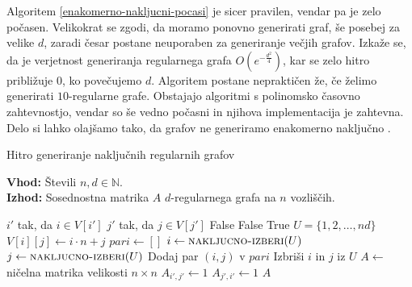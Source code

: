 Algoritem \ref{enakomerno-nakljucni-pocasi} je sicer pravilen, vendar pa je zelo počasen. Velikokrat se zgodi, da moramo ponovno generirati graf, še posebej za velike \(d\), zaradi česar postane neuporaben za generiranje večjih grafov. Izkaže se, da je verjetnost generiranja regularnega grafa \(O(e^{-\frac{d^2}{4}})\), kar se zelo hitro približuje \(0\), ko povečujemo \(d\). Algoritem postane nepraktičen že, če želimo generirati \(10\)-regularne grafe. Obstajajo algoritmi s polinomsko časovno zahtevnostjo, vendar so še vedno počasni in njihova implementacija je zahtevna. Delo si lahko olajšamo tako, da grafov ne generiramo enakomerno naključno \cite{STEGER_WORMALD_1999}.

\begin{algorithm}[H]
    \caption{Hitro generiranje naključnih regularnih grafov}
    \label{enakomerno-nakljucni-hitro}
    \raggedright
    \textbf{Vhod:} Števili \(n, d \in \mathbb N\). \\
    \textbf{Izhod:} Sosednostna matrika \(A\) \(d\)-regularnega grafa na \(n\) vozliščih.
    \begin{algorithmic}[1]
        \State \(i'\) tak, da \(i\in V[i']\)
        \State \(j'\) tak, da \(j\in V[j']\)
        \State \Return False 
        \EndIf
        \State \Return False 
        \EndIf
        \State \Return True
        \EndFunction
        \State \(U = \{1, 2, \ldots, nd\}\) 
        \State \(V[i][j] \gets i\cdot n + j\) 
        \EndFor
        \EndFor
        \State \(pari \gets []\)
        \State \(i\gets \Call{nakljucno-izberi}{U}\)
        \State \(j\gets \Call{nakljucno-izberi}{U}\)
        \State Dodaj par \((i, j)\) v \(pari\)
        \State Izbriši \(i\) in \(j\) iz \(U\)
        \EndIf
        \EndWhile
        \State \(A \gets\) ničelna matrika velikosti \(n \times n\)
        \State \(A_{i', j'} \gets 1\)
        \State \(A_{j', i'} \gets 1\)
        \EndFor
        \State \Return $A$
        \EndFunction
    \end{algorithmic}
\end{algorithm}

